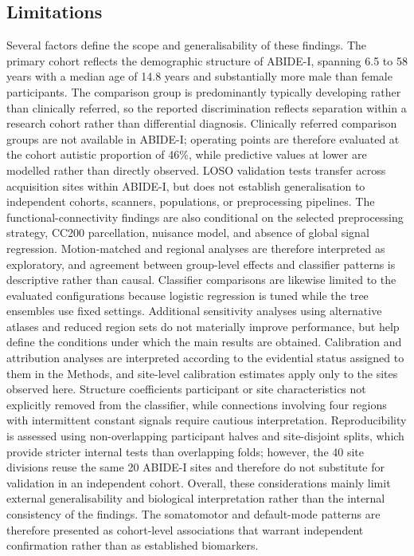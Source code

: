 \subsection{Limitations}
\label{subsec:limitations}

Several factors define the scope and generalisability of these findings. The primary cohort reflects the demographic structure of ABIDE-I, spanning 6.5 to 58 years with a median age of 14.8 years and substantially more male than female participants. The comparison group is predominantly typically developing rather than clinically referred, so the reported discrimination reflects separation within a research cohort rather than differential diagnosis. Clinically referred comparison groups are not available in ABIDE-I; operating points are therefore evaluated at the cohort autistic proportion of 46\%, while predictive values at lower  are modelled rather than directly observed. LOSO validation tests transfer across acquisition sites within ABIDE-I, but does not establish generalisation to independent cohorts, scanners, populations, or preprocessing pipelines. The functional-connectivity findings are also conditional on the selected preprocessing strategy, CC200 parcellation, nuisance model, and absence of global signal regression. Motion-matched and regional analyses are therefore interpreted as exploratory, and agreement between group-level effects and classifier patterns is descriptive rather than causal. Classifier comparisons are likewise limited to the evaluated configurations because logistic regression is tuned while the tree ensembles use fixed settings. Additional sensitivity analyses using alternative atlases and reduced region sets do not materially improve performance, but help define the conditions under which the main results are obtained. Calibration and attribution analyses are interpreted according to the evidential status assigned to them in the Methods, and site-level calibration estimates apply only to the sites observed here. Structure coefficients  participant or site characteristics not explicitly removed from the classifier, while connections involving four regions with intermittent constant signals require cautious interpretation. Reproducibility is assessed using non-overlapping participant halves and site-disjoint splits, which provide stricter internal tests than overlapping folds; however, the 40 site divisions reuse the same 20 ABIDE-I sites and therefore do not substitute for validation in an independent cohort. Overall, these considerations mainly limit external generalisability and biological interpretation rather than the internal consistency of the findings. The somatomotor and default-mode patterns are therefore presented as cohort-level associations that warrant independent confirmation rather than as established biomarkers.

